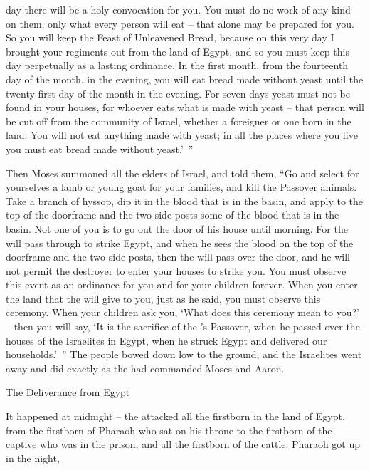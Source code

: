{day
there will be
a holy
convocation
for you. You must do
no
work
of any kind
on them, only
what
every
person
will eat
– that
alone
may be prepared for you.
So you will keep
the Feast of Unleavened
Bread, because
on this very
day
I brought your regiments
out
from the land
of Egypt,
and so you must keep
this
day
perpetually
as a lasting
ordinance.
In the first
month, from the fourteenth
day
of the month,
in the evening,
you will eat
bread made without yeast
until
the twenty-first
day
of the month
in the evening.
For seven
days
yeast
must not
be found
in your houses,
for
whoever
eats
what is made with yeast
– that person will be cut off
from the community
of Israel,
whether a foreigner
or one born
in the land.
You will not
eat
anything
made with yeast;
in all
the places
where you live you must eat
bread made without yeast.’ ”
\par }{\PP {}Then Moses
summoned
all
the elders
of Israel,
and told
them,
“Go and select
for yourselves a lamb or young goat for your
families,
and kill
the Passover animals.
Take
a branch
of hyssop,
dip
it in the blood
that
is in the basin,
and apply
to
the top of the doorframe
and the two
side posts some
of the blood
that
is in the basin.
Not
one of you
is to go out
the door
of his house
until
morning.
For the
{}
will pass
through to strike
Egypt,
and when he sees
the
blood
on
the top of the doorframe
and the two
side posts, then
the {}
will pass over
the door,
and he will
not
permit
the destroyer
to enter
your houses
to
strike you.
You must observe
this
event
as an ordinance
for you and for your children
forever.
When
you enter
the land
that
the {}
will give
to you, just
as he said,
you must observe
this
ceremony.
When
your children
ask you, ‘What
does this
ceremony mean to you?’ –
then you will say,
‘It is
the sacrifice
of the
{}’s
Passover,
when he passed
over
the houses
of the Israelites
in Egypt,
when he struck
Egypt
and delivered
our households.’ ”
The people
bowed down low to the ground,
and the Israelites
went
away and did
exactly
as the
{}
had commanded
Moses
and Aaron.
\par }{\SH The Deliverance from Egypt
\par }{\PP {}It happened
at midnight
– the
{}
attacked
all
the firstborn
in the land
of Egypt,
from the firstborn
of Pharaoh
who sat
on
his throne
to
the firstborn
of the captive
who
was in the prison,
and all
the firstborn
of the cattle.
Pharaoh
got
up in the night,
}
